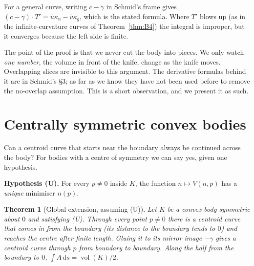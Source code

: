 \documentclass[11pt]{article}
\theoremstyle{plain}
\newtheorem{theorem}[lemma]{Theorem}
\theoremstyle{definition}
\theoremstyle{remark}
\newcommand{\vol}{\operatorname{vol}}
\newcommand{\dd}{\,\mathrm{d}}
\begin{document}
For a general curve, writing $c-\gamma$ in Schmid's frame gives $(c-\gamma)\cdot T'=\bar u\kappa_n-\bar v\kappa_g$, which is the stated formula. Where $T'$ blows up (as in the infinite-curvature curves of Theorem~\ref{thm:B4}) the integral is improper, but it converges because the left side is finite.

The point of the proof is that we never cut the body into pieces. We only watch \emph{one number}, the volume in front of the knife, change as the knife moves. Overlapping slices are invisible to this argument. The derivative formulas behind it are in Schmid's \S3; as far as we know they have not been used before to remove the no-overlap assumption. This is a short observation, and we present it as such.

\section{Centrally symmetric convex bodies}\label{sec:symmetric}

Can a centroid curve that starts near the boundary always be continued across the body? For bodies with a centre of symmetry we can say yes, given one hypothesis.

\medskip
\noindent\textbf{Hypothesis (U).} For every $p\ne0$ inside $K$, the function $n\mapsto V(n,p)$ has a \emph{unique} minimiser $n(p)$.

\begin{theorem}[Global extension, assuming (U)]\label{thm:C}
Let $K$ be a convex body symmetric about $0$ and satisfying (U). Through every point $p\ne0$ there is a centroid curve that comes in from the boundary (its distance to the boundary tends to $0$) and reaches the centre after finite length. Gluing it to its mirror image $-\gamma$ gives a centroid curve through $p$ from boundary to boundary. Along the half from the boundary to $0$, $\int A\dd s=\vol(K)/2$.
\end{theorem}
\end{document}
